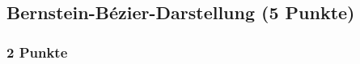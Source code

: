 \newif\ifvimbug
\vimbugfalse

\ifvimbug

\fi


\subsection{Bernstein-Bézier-Darstellung (5 Punkte)}
\subsubsection{2 Punkte}
\begin{center}
\end{center}
